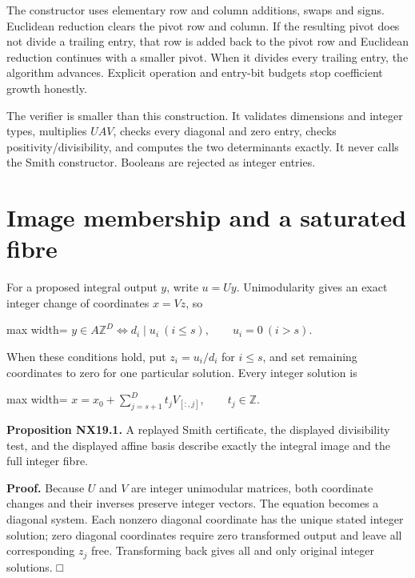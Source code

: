 \documentclass[
  11pt,
  a4paper,
]{report}
\begin{document}
The constructor uses elementary row and column additions, swaps and
signs. Euclidean reduction clears the pivot row and column. If the
resulting pivot does not divide a trailing entry, that row is added back
to the pivot row and Euclidean reduction continues with a smaller pivot.
When it divides every trailing entry, the algorithm advances. Explicit
operation and entry-bit budgets stop coefficient growth honestly.

The verifier is smaller than this construction. It validates dimensions
and integer types, multiplies \(UAV\), checks every diagonal and zero
entry, checks positivity/divisibility, and computes the two determinants
exactly. It never calls the Smith constructor. Booleans are rejected as
integer entries.

\hypertarget{image-membership-and-a-saturated-fibre}{%
\section{Image membership and a saturated
fibre}\label{image-membership-and-a-saturated-fibre}}

For a proposed integral output \(y\), write \(u=Uy\). Unimodularity
gives an exact integer change of coordinates \(x=Vz\), so

\begin{center}
\begin{adjustbox}{max width=\linewidth}
$\displaystyle
 y\in A\mathbb Z^D
 \iff d_i\mid u_i\ (i\le s),\qquad u_i=0\ (i>s).
$
\end{adjustbox}
\end{center}

When these conditions hold, put \(z_i=u_i/d_i\) for \(i\le s\), and set
remaining coordinates to zero for one particular solution. Every integer
solution is

\begin{center}
\begin{adjustbox}{max width=\linewidth}
$\displaystyle
 x=x_0+\sum_{j=s+1}^D t_j V_{[:,j]},\qquad t_j\in\mathbb Z.
$
\end{adjustbox}
\end{center}

\textbf{Proposition NX19.1.} A replayed Smith certificate, the displayed
divisibility test, and the displayed affine basis describe exactly the
integral image and the full integer fibre.

\textbf{Proof.} Because \(U\) and \(V\) are integer unimodular matrices,
both coordinate changes and their inverses preserve integer vectors. The
equation becomes a diagonal system. Each nonzero diagonal coordinate has
the unique stated integer solution; zero diagonal coordinates require
zero transformed output and leave all corresponding \(z_j\) free.
Transforming back gives all and only original integer solutions. □
\end{document}
